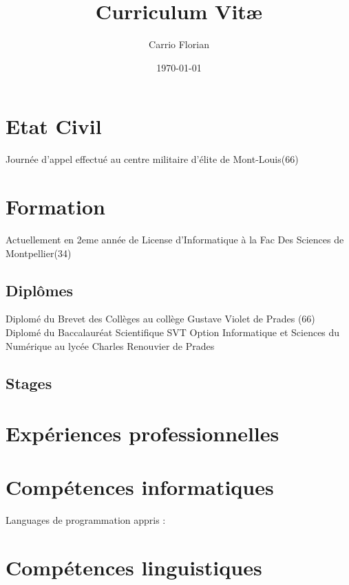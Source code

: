 \documentclass[a4paper]{article}
\title{Curriculum Vit\ae}
\author{Carrio Florian}
\date{\today}
\begin{document}
\maketitle
\section{\’Etat Civil}
Journée d'appel effectué au centre militaire d'élite de Mont-Louis(66)
\section{Formation}
Actuellement en 2eme année de License d'Informatique à la Fac Des Sciences de Montpellier(34)
\subsection{Diplômes}
Diplomé du Brevet des Collèges au collège Gustave Violet de Prades (66)
Diplomé du Baccalauréat Scientifique SVT Option Informatique et Sciences du Numérique au lycée Charles Renouvier de Prades
\subsection{Stages}
\section{Expériences professionnelles}
\section*{Compétences informatiques}
Languages de programmation appris :

\section*{Compétences linguistiques}
\end{document}
